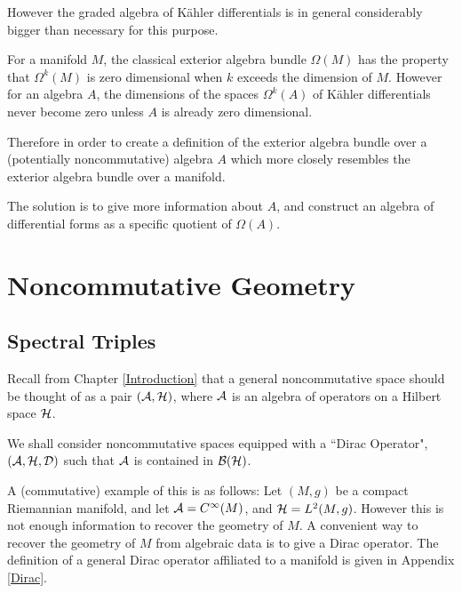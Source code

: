However the graded algebra of K\"ahler differentials
is in general considerably bigger than necessary for this purpose. 

For a manifold $M$, the classical exterior algebra
bundle $\Omega(M)$ has the property that $\Omega^k(M)$
is zero dimensional when $k$ exceeds the dimension of $M$. However 
for an algebra $A$, the dimensions of the spaces $\Omega^k(A)$
of K\"ahler differentials never become zero unless $A$
is already zero dimensional. 

Therefore in order to create a definition of the exterior
algebra bundle over a (potentially noncommutative) algebra $A$ which
more closely resembles the exterior algebra bundle over a manifold.

The solution is to give more information about $A$, and construct
an algebra of differential forms as a specific quotient of $\Omega(A)$.




\section{Noncommutative Geometry}
\subsection{Spectral Triples}
Recall from Chapter \ref{Introduction} that a general noncommutative
space should be thought of as a pair $(\mathcal{A},\mathcal{H})$, where $\mathcal{A}$
is an algebra of operators on a Hilbert space $\mathcal{H}$. 


We shall consider noncommutative spaces equipped with a ``Dirac Operator", $(\mathcal{A},\mathcal{H},\mathcal{D})$
such that $\mathcal{A}$ is contained in $\mathcal{B}(\mathcal{H})$.

A (commutative) example of this is as follows: Let $(M,g)$ be a compact Riemannian manifold,
and let $\mathcal{A} = C^\infty(M)$, and $\mathcal{H} = L^2(M,g)$. However
this is not enough information to recover the geometry of $M$. A convenient
way to recover the geometry of $M$ from algebraic data is to give a Dirac operator.
The definition of a general Dirac operator affiliated
to a manifold is given in Appendix \ref{Dirac}. 


